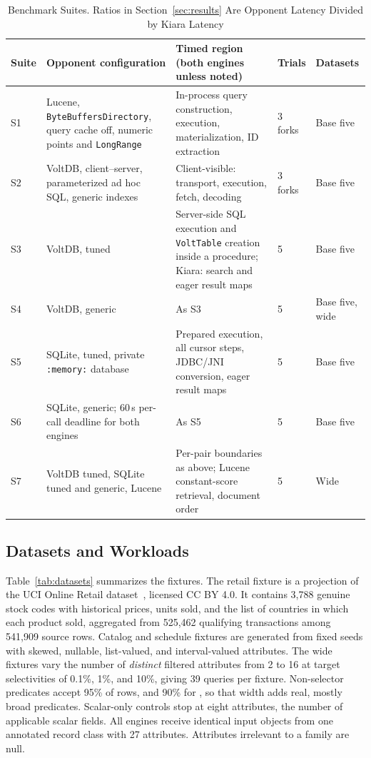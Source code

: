 \begin{table}[t]
\centering
\caption{Benchmark Suites. Ratios in Section~\ref{sec:results} Are Opponent Latency Divided by Kiara Latency}
\label{tab:suites}
\setlength{\tabcolsep}{3.5pt}
\renewcommand{\arraystretch}{1.1}
\begin{tabular}{@{}lP{44mm}P{74mm}lP{22mm}@{}}
\toprule
Suite & Opponent configuration & Timed region (both engines unless noted) & Trials & Datasets \\
\midrule
S1 & Lucene, \texttt{ByteBuffersDirectory}, query cache off, numeric points and \texttt{LongRange} & In-process query construction, execution, materialization, ID extraction & 3 forks & Base five \\
S2 & VoltDB, client--server, parameterized ad hoc SQL, generic indexes & Client-visible: transport, execution, fetch, decoding & 3 forks & Base five \\
S3 & VoltDB, tuned & Server-side SQL execution and \texttt{VoltTable} creation inside a procedure; Kiara: search and eager result maps & 5 & Base five \\
S4 & VoltDB, generic & As S3 & 5 & Base five, wide \\
S5 & SQLite, tuned, private \texttt{:memory:} database & Prepared execution, all cursor steps, JDBC/JNI conversion, eager result maps & 5 & Base five \\
S6 & SQLite, generic; 60\,s per-call deadline for both engines & As S5 & 5 & Base five \\
S7 & VoltDB tuned, SQLite tuned and generic, Lucene & Per-pair boundaries as above; Lucene constant-score retrieval, document order & 5 & Wide \\
\bottomrule
\end{tabular}
\end{table}

\subsection{Datasets and Workloads}
Table~\ref{tab:datasets} summarizes the fixtures. The retail fixture is a projection of the UCI Online Retail dataset~\cite{chen2015online}, licensed CC BY 4.0. It contains 3,788 genuine stock codes with historical prices, units sold, and the list of countries in which each product sold, aggregated from 525,462 qualifying transactions among 541,909 source rows. Catalog and schedule fixtures are generated from fixed seeds with skewed, nullable, list-valued, and interval-valued attributes. The wide fixtures vary the number of \emph{distinct} filtered attributes from 2 to 16 at target selectivities of 0.1\%, 1\%, and 10\%, giving 39 queries per fixture. Non-selector predicates accept 95\% of rows, and 90\% for , so that width adds real, mostly broad predicates. Scalar-only controls stop at eight attributes, the number of applicable scalar fields. All engines receive identical input objects from one annotated record class with 27 attributes. Attributes irrelevant to a family are null.

